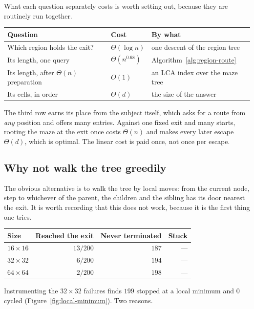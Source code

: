 What each question separately costs is worth setting out, because they are
routinely run together.

\begin{center}
\begin{tabular}{@{}lll@{}}
  \toprule
  Question & Cost & By what \\
  \midrule
  Which region holds the exit? & $\Theta(\log n)$
    & one descent of the region tree \\
  Its length, one query & $\Theta(n^{0.68})$
    & Algorithm~\ref{alg:region-route} \\
  Its length, after $\Theta(n)$ preparation & $O(1)$
    & an LCA index over the maze tree \\
  Its cells, in order & $\Theta(d)$
    & the size of the answer \\
  \bottomrule
\end{tabular}
\end{center}

The third row earns its place from the subject itself, which asks for a route
from \emph{any} position and offers many entries. Against one fixed exit and
many starts, rooting the maze at the exit once costs $\Theta(n)$ and makes every
later escape $\Theta(d)$, which is optimal. The linear cost is paid once, not
once per escape.

\subsection{Why not walk the tree greedily}

The obvious alternative is to walk the tree by local moves: from the current
node, step to whichever of the parent, the children and the sibling has its door
nearest the exit. It is worth recording that this does not work, because it is
the first thing one tries.

\begin{center}
\begin{tabular}{@{}lrrr@{}}
  \toprule
  Size & Reached the exit & Never terminated & Stuck \\
  \midrule
  $16\times16$ & $13/200$ & $187$ & --- \\
  $32\times32$ & $6/200$  & $194$ & --- \\
  $64\times64$ & $2/200$  & $198$ & --- \\
  \bottomrule
\end{tabular}
\end{center}

Instrumenting the $32\times32$ failures finds $199$ stopped at a local minimum
and $0$ cycled (Figure~\ref{fig:local-minimum}). Two reasons.

